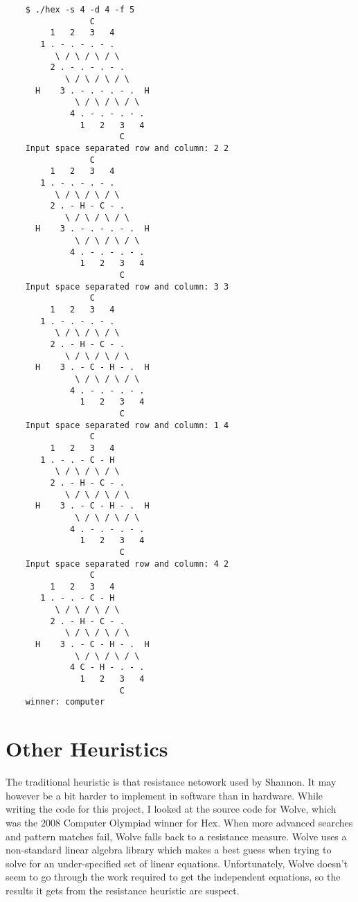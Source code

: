 \documentclass[12pt,titlepage]{amsart}
\begin{document}
\singlespacing
\begin{verbatim}
    $ ./hex -s 4 -d 4 -f 5
                 C
         1   2   3   4
       1 . - . - . - .
          \ / \ / \ / \
         2 . - . - . - .
            \ / \ / \ / \
      H    3 . - . - . - .  H
              \ / \ / \ / \
             4 . - . - . - .
               1   2   3   4
                       C
    Input space separated row and column: 2 2
                 C
         1   2   3   4
       1 . - . - . - .
          \ / \ / \ / \
         2 . - H - C - .
            \ / \ / \ / \
      H    3 . - . - . - .  H
              \ / \ / \ / \
             4 . - . - . - .
               1   2   3   4
                       C
    Input space separated row and column: 3 3
                 C
         1   2   3   4
       1 . - . - . - .
          \ / \ / \ / \
         2 . - H - C - .
            \ / \ / \ / \
      H    3 . - C - H - .  H
              \ / \ / \ / \
             4 . - . - . - .
               1   2   3   4
                       C
    Input space separated row and column: 1 4
                 C
         1   2   3   4
       1 . - . - C - H
          \ / \ / \ / \
         2 . - H - C - .
            \ / \ / \ / \
      H    3 . - C - H - .  H
              \ / \ / \ / \
             4 . - . - . - .
               1   2   3   4
                       C
    Input space separated row and column: 4 2
                 C
         1   2   3   4
       1 . - . - C - H
          \ / \ / \ / \
         2 . - H - C - .
            \ / \ / \ / \
      H    3 . - C - H - .  H
              \ / \ / \ / \
             4 C - H - . - .
               1   2   3   4
                       C
    winner: computer
\end{verbatim}
\doublespacing

\section{Other Heuristics}

The traditional heuristic is that resistance netowork used by Shannon. It may
however  be a bit harder to implement in software than in hardware. While
writing the code for this project, I looked at the source code for Wolve, which
was the 2008 Computer Olympiad winner for Hex. When more advanced searches and
pattern matches fail, Wolve falls back to a resistance measure. Wolve uses a
non-standard linear algebra library which makes a best guess when trying to
solve for an under-specified set of linear equations.  Unfortunately, Wolve
doesn't seem to go through the work required to get the independent equations,
so the results it gets from the resistance heuristic are suspect.
\end{document}
